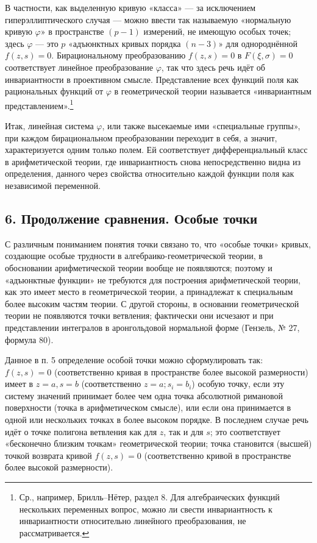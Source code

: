 \documentclass[11pt]{article}
\begin{document}
В частности, как выделенную кривую «класса» --- за исключением гиперэллиптического случая --- можно ввести так называемую «нормальную кривую \(\varphi\)» в пространстве \((p-1)\) измерений, не имеющую особых точек; здесь \(\varphi\) --- это \(p\) «адъюнктных кривых порядка \((n-3)\)» для однороднённой \(f(z,s)=0\). Бирациональному преобразованию \(f(z,s)=0\) в \(F(\xi,\sigma)=0\) соответствует линейное преобразование \(\varphi\), так что здесь речь идёт об инвариантности в проективном смысле. Представление всех функций поля как рациональных функций от \(\varphi\) в геометрической теории называется «инвариантным представлением».\footnote{Ср., например, Брилль--Нётер, раздел 8. Для алгебраических функций нескольких переменных вопрос, можно ли свести инвариантность к инвариантности относительно линейного преобразования, не рассматривается.}

Итак, линейная система \(\varphi\), или также высекаемые ими «специальные группы», при каждом бирациональном преобразовании переходит в себя, а значит, характеризуется одним только полем. Ей соответствует дифференциальный класс в арифметической теории, где инвариантность снова непосредственно видна из определения, данного через свойства относительно каждой функции поля как независимой переменной.

\subsection*{6. Продолжение сравнения. Особые точки}
С различным пониманием понятия точки связано то, что «особые точки» кривых, создающие особые трудности в алгебраико-геометрической теории, в обосновании арифметической теории вообще не появляются; поэтому и «адъюнктные функции» не требуются для построения арифметической теории, как это имеет место в геометрической теории, а принадлежат к специальным более высоким частям теории. С другой стороны, в основании геометрической теории не появляются точки ветвления; фактически они исчезают и при представлении интегралов в аронгольдовой нормальной форме (Гензель, № 27, формула 80).

Данное в п. 5 определение особой точки можно сформулировать так: \(f(z,s)=0\) (соответственно кривая в пространстве более высокой размерности) имеет в \(z=a,s=b\) (соответственно \(z=a; s_i=b_i\)) особую точку, если эту систему значений принимает более чем одна точка абсолютной римановой поверхности (точка в арифметическом смысле), или если она принимается в одной или нескольких точках в более высоком порядке. В последнем случае речь идёт о точке полигона ветвления как для \(z\), так и для \(s\); это соответствует «бесконечно близким точкам» геометрической теории; точка становится (высшей) точкой возврата кривой \(f(z,s)=0\) (соответственно кривой в пространстве более высокой размерности).
\end{document}

